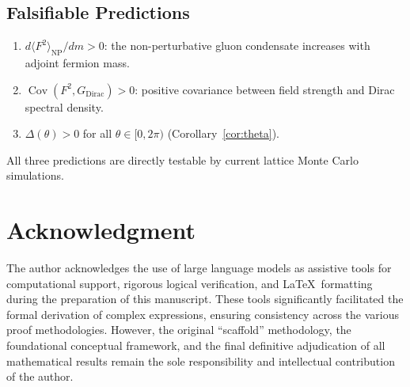 \documentclass[12pt,a4paper]{article}
\theoremstyle{plain}
\theoremstyle{definition}
\theoremstyle{remark}
\begin{document}
\subsection{Falsifiable Predictions}

\begin{enumerate}[label=(\roman*)]
\item $d\langle F^2\rangle_{\mathrm{NP}}/dm>0$: the non-perturbative gluon condensate increases with adjoint fermion mass.
\item $\operatorname{Cov}(F^2,G_{\mathrm{Dirac}})>0$: positive covariance between field strength and Dirac spectral density.
\item $\Delta(\theta)>0$ for all $\theta\in[0,2\pi)$ (Corollary~\ref{cor:theta}).
\end{enumerate}
All three predictions are directly testable by current lattice Monte Carlo simulations.

\section*{Acknowledgment}

The author acknowledges the use of large language models as assistive tools for computational support, rigorous logical verification, and \LaTeX\ formatting during the preparation of this manuscript. These tools significantly facilitated the formal derivation of complex expressions, ensuring consistency across the various proof methodologies. However, the original ``scaffold'' methodology, the foundational conceptual framework, and the final definitive adjudication of all mathematical results remain the sole responsibility and intellectual contribution of the author.



\end{document}
